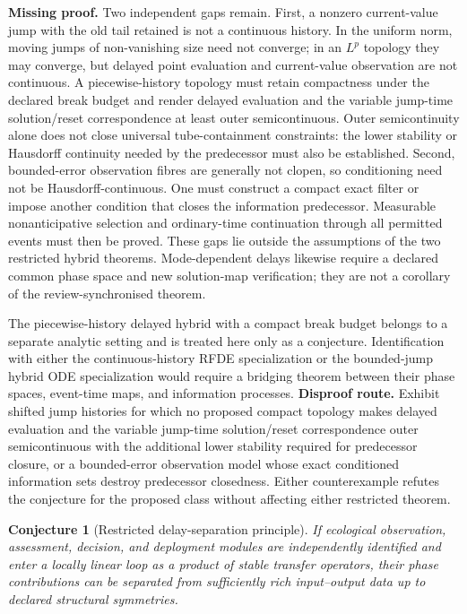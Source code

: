 \documentclass[11pt]{article}
\newtheorem{conjecture}{Conjecture}
\theoremstyle{definition}
\begin{document}
\noindent\textbf{Missing proof.} Two independent gaps remain.  First, a nonzero current-value jump with the old tail retained is not a continuous history.  In the uniform norm, moving jumps of non-vanishing size need not converge; in an $L^p$ topology they may converge, but delayed point evaluation and current-value observation are not continuous.  A piecewise-history topology must retain compactness under the declared break budget and render delayed evaluation and the variable jump-time solution/reset correspondence at least outer semicontinuous.  Outer semicontinuity alone does not close universal tube-containment constraints: the lower stability or Hausdorff continuity needed by the predecessor must also be established.  Second, bounded-error observation fibres are generally not clopen, so conditioning need not be Hausdorff-continuous.  One must construct a compact exact filter or impose another condition that closes the information predecessor.  Measurable nonanticipative selection and ordinary-time continuation through all permitted events must then be proved.  These gaps lie outside the assumptions of the two restricted hybrid theorems.  Mode-dependent delays likewise require a declared common phase space and new solution-map verification; they are not a corollary of the review-synchronised theorem.

The piecewise-history delayed hybrid with a compact break budget belongs to a separate analytic setting and is treated here only as a conjecture.  Identification with either the continuous-history RFDE specialization or the bounded-jump hybrid ODE specialization would require a bridging theorem between their phase spaces, event-time maps, and information processes.  
\textbf{Disproof route.} Exhibit shifted jump histories for which no proposed compact topology makes delayed evaluation and the variable jump-time solution/reset correspondence outer semicontinuous with the additional lower stability required for predecessor closure, or a bounded-error observation model whose exact conditioned information sets destroy predecessor closedness.  Either counterexample refutes the conjecture for the proposed class without affecting either restricted theorem.

\begin{conjecture}[Restricted delay-separation principle]
If ecological observation, assessment, decision, and deployment modules are independently identified and enter a locally linear loop as a product of stable transfer operators, their phase contributions can be separated from sufficiently rich input--output data up to declared structural symmetries.
\end{conjecture}
\end{document}
